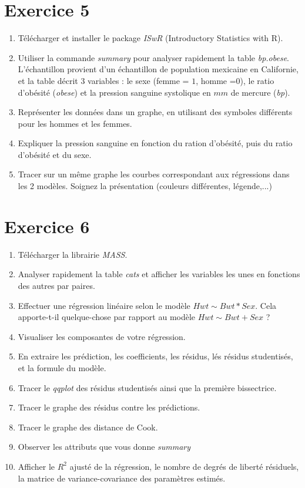 \section*{Exercice 5}

\begin{enumerate}
\item Télécharger et installer le package \textit{ISwR} (Introductory Statistics with R).
\item Utiliser la commande \textit{summary} pour analyser rapidement la table \textit{bp.obese}. L'échantillon provient d'un échantillon de population mexicaine en Californie, et la table décrit $3$ variables : le sexe (femme = $1$, homme =$0$), le ratio d'obésité (\textit{obese}) et la pression sanguine systolique en $mm$ de mercure (\textit{bp}).
\item Représenter les données dans un graphe, en utilisant des symboles différents pour les hommes et les femmes.
\item Expliquer la pression sanguine en fonction du ration d'obésité, puis du ratio d'obésité et du sexe.
\item Tracer sur un même graphe les courbes correspondant aux régressions dans les 2 modèles. Soignez la présentation (couleurs différentes, légende,...)
\end{enumerate}

\section*{Exercice 6}
\begin{enumerate}
\item Télécharger la librairie \textit{MASS}.
\item Analyser rapidement la table \textit{cats} et afficher les variables les unes en fonctions des autres par paires.
\item Effectuer une régression linéaire selon le modèle $Hwt \sim Bwt * Sex $. Cela apporte-t-il quelque-chose par rapport au modèle $Hwt \sim Bwt + Sex $ ? 
\item Visualiser les composantes de votre régression.
\item En extraire les prédiction, les coefficients, les résidus, lés résidus studentisés, et la formule du modèle.
\item Tracer le \textit{qqplot} des résidus studentisés ainsi que la première bissectrice.
\item Tracer le graphe des résidus contre les prédictions.
\item Tracer le graphe des distance de Cook.
\item Observer les attributs que vous donne \textit{summary}
\item Afficher le $R^2$ ajusté de la régression, le nombre de degrés de liberté résiduels, la matrice de variance-covariance des paramètres estimés. 
\end{enumerate}

